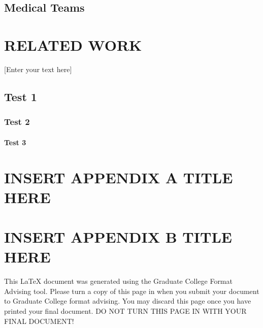 \documentclass[oneside,11pt]{memoir}
\begin{document}
\section{Medical Teams}






\chapter{RELATED WORK}

\DoubleSpacing
\setlength{\parindent}{.5in}
[Enter your text here]

\section{Test 1}
\subsection{Test 2}
\subsubsection{Test 3}



\vspace*{1in}
\begin{SingleSpace}
	

\end{SingleSpace}


\appendix
{}
\chapter{\uppercase{Insert Appendix A Title here}}
\clearpage
\chapter{\uppercase{Insert Appendix B Title here}}
\clearpage


This LaTeX document was generated using the Graduate College Format Advising tool. Please turn a copy of this page in when you submit your document to Graduate College format advising. You may discard this page once you have printed your final document. DO NOT TURN THIS PAGE IN WITH YOUR FINAL DOCUMENT!
\end{document}

